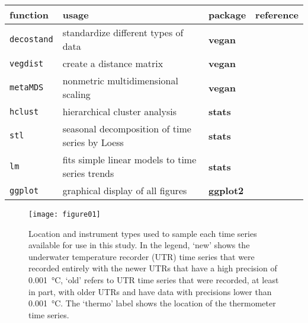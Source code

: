 \documentclass{ametsoc}
\begin{document}
\begin{table}[ht]
\label{function-table}
\centering
\small
\begin{tabular}{llll}
\hline
function & usage & package & reference \\
 \hline
 \texttt{decostand} & standardize different types of data & \textbf{vegan} & \citet{vegan}\\
 \texttt{vegdist} & create a distance matrix & \textbf{vegan} & \citet{vegan}\\
 \texttt{metaMDS} & nonmetric multidimensional scaling & \textbf{vegan} & \citet{vegan}\\
 \texttt{hclust} & hierarchical cluster analysis & \textbf{stats} & \citet{R}\\
 \texttt{stl} & seasonal decomposition of time series by Loess & \textbf{stats} & \citet{R}\\
 \texttt{lm} & fits simple linear models to time series trends & \textbf{stats} & \citet{R}\\
 \texttt{ggplot} & graphical display of all figures & \textbf{ggplot2} & \citet{ggplot2}\\
  \hline
  \end{tabular}
\end{table}

%
\begin{figure}
\centering \texttt{[image: figure01]}
\caption[\small Location and instrument types used to sample each time series available for use in this study]{Location and instrument types used to sample each time series available for use in this study. In the legend, `new' shows the underwater temperature recorder (UTR) time series that were recorded entirely with the newer UTRs that have a high precision of \SI{0.001}{\degreeCelsius}, `old' refers to UTR time series that were recorded, at least in part, with older UTRs and have data with precisions lower than \SI{0.001}{\degreeCelsius}. The `thermo' label shows the location of the thermometer time series.}
\label{figure01}
\end{figure}
\end{document}
